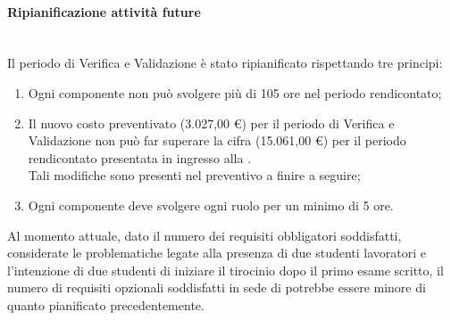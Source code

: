 \paragraph{Ripianificazione attività future} \mbox{}\\
Il periodo di Verifica e Validazione è stato ripianificato rispettando tre principi:
\begin{enumerate}
\item Ogni componente non può svolgere più di 105 ore nel periodo rendicontato;
\item Il nuovo costo preventivato (3.027,00 \euro) per il periodo di Verifica e Validazione non può far superare la cifra (15.061,00 \euro) per il periodo rendicontato presentata in ingresso alla \RR{}. \\Tali modifiche sono presenti nel preventivo a finire a seguire;
\item Ogni componente deve svolgere ogni ruolo per un minimo di 5 ore.
\end{enumerate}

Al momento attuale, dato il numero dei requisiti obbligatori soddisfatti, considerate le problematiche legate alla presenza di due studenti lavoratori e l'intenzione di due studenti di iniziare il tirocinio dopo il primo esame scritto, il numero di requisiti opzionali soddisfatti in sede di \RA{} potrebbe essere minore di quanto pianificato precedentemente.